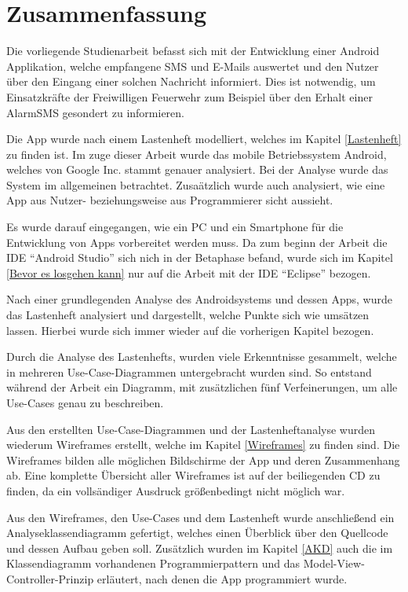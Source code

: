 \section{Zusammenfassung}
Die vorliegende Studienarbeit befasst sich mit der Entwicklung einer Android Applikation, welche empfangene SMS und E-Mails auswertet und den Nutzer \"uber den Eingang einer solchen Nachricht informiert. Dies ist notwendig, um Einsatzkr\"afte der Freiwilligen Feuerwehr zum Beispiel \"uber den Erhalt einer AlarmSMS gesondert zu informieren.

Die App wurde nach einem Lastenheft modelliert, welches im Kapitel \ref{Lastenheft} zu finden ist. Im zuge dieser Arbeit wurde das mobile Betriebssystem Android, welches von Google Inc. stammt genauer analysiert. Bei der Analyse wurde das System im allgemeinen betrachtet. Zusa\"atzlich wurde auch analysiert, wie eine App aus Nutzer- beziehungsweise aus Programmierer sicht aussieht. 

Es wurde darauf eingegangen, wie ein PC und ein Smartphone f\"ur die Entwicklung von Apps vorbereitet werden muss. Da zum beginn der Arbeit die \ac{IDE} "`Android Studio"' sich nich in der Betaphase befand, wurde sich im Kapitel \ref{Bevor es losgehen kann} nur auf die Arbeit mit der \ac{IDE} "`Eclipse"' bezogen. 

Nach einer grundlegenden Analyse des Androidsystems und dessen Apps, wurde das Lastenheft analysiert und dargestellt, welche Punkte sich wie ums\"atzen lassen. Hierbei wurde sich immer wieder auf die vorherigen Kapitel bezogen.

Durch die Analyse des Lastenhefts, wurden viele Erkenntnisse gesammelt, welche in mehreren Use-Case-Diagrammen untergebracht wurden sind. So entstand w\"ahrend der Arbeit ein Diagramm, mit zus\"atzlichen f\"unf Verfeinerungen, um alle Use-Cases genau zu beschreiben.

Aus den erstellten Use-Case-Diagrammen und der Lastenheftanalyse wurden wiederum Wireframes erstellt, welche im Kapitel \ref{Wireframes} zu finden sind. Die Wireframes bilden alle m\"oglichen Bildschirme der App und deren Zusammenhang ab. Eine komplette \"Ubersicht aller Wireframes ist auf der beiliegenden CD zu finden, da ein volls\"andiger Ausdruck gr\"o\ss{}enbedingt nicht m\"oglich war.

Aus den Wireframes, den Use-Cases und dem Lastenheft wurde anschlie\ss{}end ein Analyseklassendiagramm gefertigt, welches einen \"Uberblick \"uber den Quellcode und dessen Aufbau geben soll. Zus\"atzlich wurden im Kapitel \ref{AKD} auch die im Klassendiagramm vorhandenen Programmierpattern und das Model-View-Controller-Prinzip erl\"autert, nach denen die App programmiert wurde.

